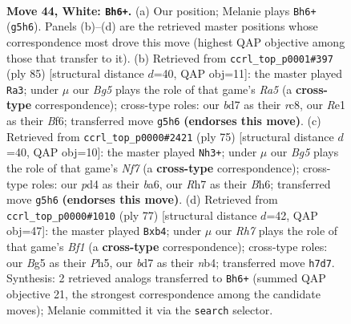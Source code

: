 \documentclass[11pt]{article}
\begin{document}
\clearpage

\begin{figure}[p]\centering
\begin{subfigure}{0.46\textwidth}\centering
\resizebox{\linewidth}{!}{%
\newchessgame
\chessboard[
  setfen={5kr1/3b3R/2n5/6B1/1p1p2P1/pP6/P1PN3K/4R3 w - - 10 44},
  showmover=false,
  pgfstyle=straightmove, color=movearrow, markmove={g5-h6}
]}
\caption{}
\end{subfigure}\hfill
\begin{subfigure}{0.46\textwidth}\centering
\resizebox{\linewidth}{!}{%
\newchessgame
\chessboard[
  setfen={2R5/8/3p1bpk/4p3/r2nPp2/2N2P2/7P/1R5K b - - 3 43},
  showmover=false,
  pgfstyle=straightmove, color=movearrow, markmove={a4-a3}
]}
\caption{}
\end{subfigure}
\\[4pt]
\begin{subfigure}{0.46\textwidth}\centering
\resizebox{\linewidth}{!}{%
\newchessgame
\chessboard[
  setfen={5r1k/8/Bp5b/3p3p/PP1N2p1/6P1/4Rn1P/6K1 b - - 0 38},
  showmover=false,
  pgfstyle=straightmove, color=movearrow, markmove={f2-h3}
]}
\caption{}
\end{subfigure}\hfill
\begin{subfigure}{0.46\textwidth}\centering
\resizebox{\linewidth}{!}{%
\newchessgame
\chessboard[
  setfen={5b2/3r3k/p5p1/5p1p/1N3P2/4PBPP/2R1K3/8 b - - 0 39},
  showmover=false,
  pgfstyle=straightmove, color=movearrow, markmove={f8-b4}
]}
\caption{}
\end{subfigure}
\caption{\textbf{Move 44, White: \texttt{Bh6+}.} (a) Our position; Melanie plays \texttt{Bh6+} (\texttt{g5h6}). Panels (b)--(d) are the retrieved master positions whose correspondence most drove this move (highest QAP objective among those that transfer to it). (b) Retrieved from \texttt{ccrl\_top\_p0001\#397} (ply 85) [structural distance $d$=40, QAP obj=11]: the master played \texttt{Ra3}; under $\mu$ our \emph{Bg5} plays the role of that game's \emph{Ra5} (a \textbf{cross-type} correspondence); cross-type roles: our \emph{b}d7 as their \emph{r}c8, our \emph{R}e1 as their \emph{B}f6; transferred move \texttt{g5h6} \textbf{(endorses this move)}. (c) Retrieved from \texttt{ccrl\_top\_p0000\#2421} (ply 75) [structural distance $d$=40, QAP obj=10]: the master played \texttt{Nh3+}; under $\mu$ our \emph{Bg5} plays the role of that game's \emph{Nf7} (a \textbf{cross-type} correspondence); cross-type roles: our \emph{p}d4 as their \emph{b}a6, our \emph{R}h7 as their \emph{B}h6; transferred move \texttt{g5h6} \textbf{(endorses this move)}. (d) Retrieved from \texttt{ccrl\_top\_p0000\#1010} (ply 77) [structural distance $d$=42, QAP obj=47]: the master played \texttt{Bxb4}; under $\mu$ our \emph{Rh7} plays the role of that game's \emph{Bf1} (a \textbf{cross-type} correspondence); cross-type roles: our \emph{B}g5 as their \emph{P}h5, our \emph{b}d7 as their \emph{n}b4; transferred move \texttt{h7d7}. Synthesis: 2 retrieved analogs transferred to \texttt{Bh6+} (summed QAP objective 21, the strongest correspondence among the candidate moves); Melanie committed it via the \texttt{search} selector.}
\label{fig:thought-m86}
\end{figure}
\end{document}
